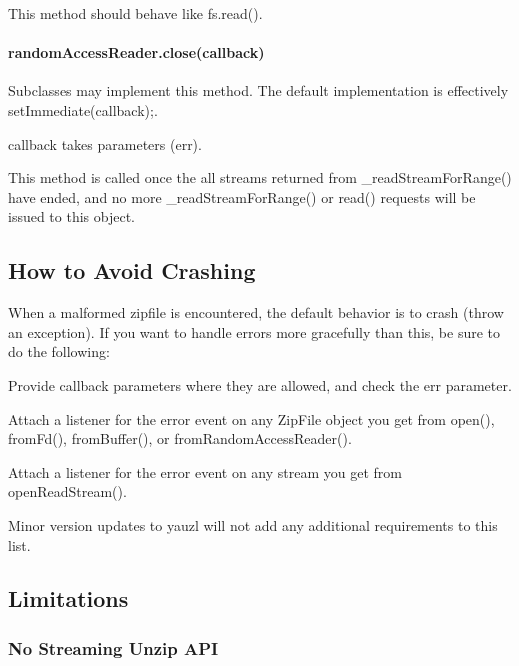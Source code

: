 This method should behave like {\ttfamily fs.\+read()}.

\paragraph*{random\+Access\+Reader.\+close(callback)}

Subclasses may implement this method. The default implementation is effectively {\ttfamily set\+Immediate(callback);}.

{\ttfamily callback} takes parameters {\ttfamily (err)}.

This method is called once the all streams returned from {\ttfamily \+\_\+read\+Stream\+For\+Range()} have ended, and no more {\ttfamily \+\_\+read\+Stream\+For\+Range()} or {\ttfamily read()} requests will be issued to this object.

\subsection*{How to Avoid Crashing}

When a malformed zipfile is encountered, the default behavior is to crash (throw an exception). If you want to handle errors more gracefully than this, be sure to do the following\+:


\begin{DoxyItemize}
\item Provide {\ttfamily callback} parameters where they are allowed, and check the {\ttfamily err} parameter.
\item Attach a listener for the {\ttfamily error} event on any {\ttfamily Zip\+File} object you get from {\ttfamily open()}, {\ttfamily from\+Fd()}, {\ttfamily from\+Buffer()}, or {\ttfamily from\+Random\+Access\+Reader()}.
\item Attach a listener for the {\ttfamily error} event on any stream you get from {\ttfamily open\+Read\+Stream()}.
\end{DoxyItemize}

Minor version updates to yauzl will not add any additional requirements to this list.

\subsection*{Limitations}

\subsubsection*{No Streaming Unzip A\+PI}

